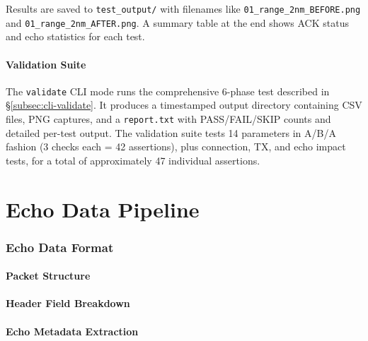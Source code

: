 \documentclass[11pt,letterpaper]{article}
\begin{document}
Results are saved to \texttt{test\_output/} with filenames like \texttt{01\_range\_2nm\_BEFORE.png} and \texttt{01\_range\_2nm\_AFTER.png}. A summary table at the end shows ACK status and echo statistics for each test.

\subsection{Validation Suite}
\label{subsec:validation-suite}

The \texttt{validate} CLI mode runs the comprehensive 6-phase test described in \S\ref{subsec:cli-validate}. It produces a timestamped output directory containing CSV files, PNG captures, and a \texttt{report.txt} with PASS/FAIL/SKIP counts and detailed per-test output. The validation suite tests 14 parameters in A/B/A fashion (3 checks each = 42 assertions), plus connection, TX, and echo impact tests, for a total of approximately 47 individual assertions.


%
%

\newpage
\part{Echo Data Pipeline}
\label{part:echo}


\section{Echo Data Format}
\label{sec:echo-data-format}

\subsection{Packet Structure}
\label{subsec:echo-packet-structure}


\subsection{Header Field Breakdown}
\label{subsec:echo-header}


\subsection{Echo Metadata Extraction}
\label{subsec:echo-metadata}
\end{document}
